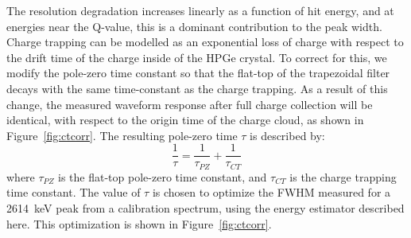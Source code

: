 \documentclass[/main.tex]{subfiles}
\begin{document}
The resolution degradation increases linearly as a function of hit energy, and at energies near the Q-value, this is a dominant contribution to the peak width.
Charge trapping can be modelled as an exponential loss of charge with respect to the drift time of the charge inside of the HPGe crystal.
To correct for this, we modify the pole-zero time constant so that the flat-top of the trapezoidal filter decays with the same time-constant as the charge trapping.
As a result of this change, the measured waveform response after full charge collection will be identical, with respect to the origin time of the charge cloud, as shown in Figure~\ref{fig:ctcorr}.
The resulting pole-zero time $\tau$ is described by:
\begin{equation}
  \frac{1}{\tau} = \frac{1}{\tau_{PZ}} + \frac{1}{\tau_{CT}}
\end{equation}
where $\tau_{PZ}$ is the flat-top pole-zero time constant, and $\tau_{CT}$ is the charge trapping time constant.
The value of $\tau$ is chosen to optimize the FWHM measured for a 2614~keV peak from a  calibration spectrum, using the energy estimator described here.
This optimization is shown in Figure~\ref{fig:ctcorr}.
\end{document}
